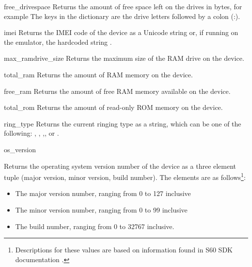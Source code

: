 \begin{funcdesc}{free_drivespace}{}
Returns the amount of free space left on the drives in bytes, for example 
 The keys in the dictionary are the drive letters 
followed by a colon (:). 
\end{funcdesc}

\begin{funcdesc}{imei}{}
Returns the IMEI code of the device as a Unicode string or, if running
on the emulator, the hardcoded string .
\end{funcdesc}

\begin{funcdesc}{max_ramdrive_size}{}
Returns the maximum size of the RAM drive on the device.
\end{funcdesc}

\begin{funcdesc}{total_ram}{}
Returns the amount of RAM memory on the device.
\end{funcdesc}

\begin{funcdesc}{free_ram}{}
Returns the amount of free RAM memory available on the device.
\end{funcdesc}

\begin{funcdesc}{total_rom}{}
Returns the amount of read-only ROM memory on the device.
\end{funcdesc}

\begin{funcdesc}{ring_type}{}
Returns the current ringing type as a string, which can be one of the 
following: , , 
,, or .
\end{funcdesc}

\begin{funcdesc}{os_version}{}

Returns the operating system version number of the device as a three element tuple (major version, minor version, build number). The 
elements are as follows\footnote{ 
Descriptions for these values are based on information found in S60 SDK 
documentation \cite{S60Doc}.}:

\begin{itemize}
\item The major version number, ranging from 0 to 127 inclusive
\item The minor version number, ranging from 0 to 99 inclusive
\item The build number, ranging from 0 to 32767 inclusive.
\end{itemize}
\end{funcdesc}

